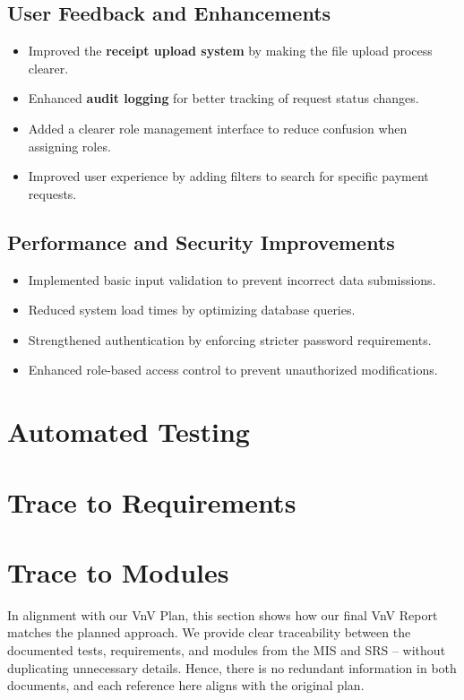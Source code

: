\documentclass[12pt, titlepage]{article}
\begin{document}
\subsection{User Feedback and Enhancements}
\begin{itemize}
  \item Improved the \textbf{receipt upload system} by making the file upload process clearer.
  \item Enhanced \textbf{audit logging} for better tracking of request status changes.
  \item Added a clearer role management interface to reduce confusion when assigning roles.
  \item Improved user experience by adding filters to search for specific payment requests.
\end{itemize}

\subsection{Performance and Security Improvements}
\begin{itemize}
  \item Implemented basic input validation to prevent incorrect data submissions.
  \item Reduced system load times by optimizing database queries.
  \item Strengthened authentication by enforcing stricter password requirements.
  \item Enhanced role-based access control to prevent unauthorized modifications.
\end{itemize}

\section{Automated Testing}
		
\section{Trace to Requirements}
		
\section{Trace to Modules}
\label{sec:TraceToModules}

In alignment with our VnV Plan, this section shows how our final VnV Report
matches the planned approach. We provide clear traceability between
the documented tests, requirements, and modules from the MIS and SRS –
without duplicating unnecessary details. Hence, there is no redundant
information in both documents, and each reference here aligns with the
original plan.
\end{document}
